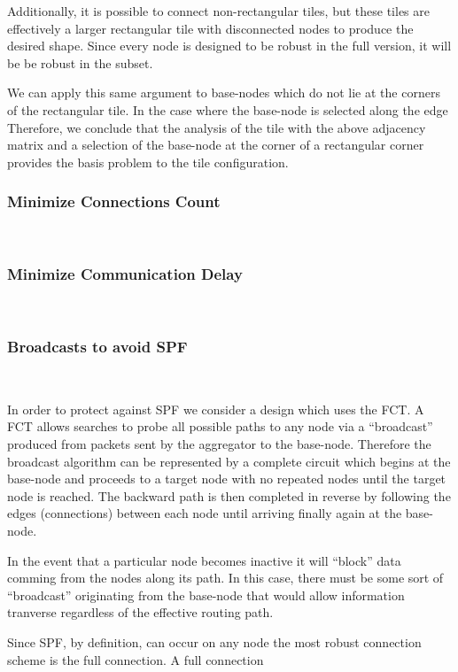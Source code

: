 Additionally, it is possible to connect non-rectangular tiles, but these tiles are effectively a larger rectangular tile with disconnected nodes to produce the desired shape.
Since every node is designed to be robust in the full version, it will be be robust in the subset.

We can apply this same argument to base-nodes which do not lie at the corners of the rectangular tile.
In the case where the base-node is selected along the edge
Therefore, we conclude that the analysis of the tile with the above adjacency matrix and a selection of the base-node at the corner of a rectangular corner provides the basis problem to the tile configuration.

\subsubsection{Minimize Connections Count}~\label{sec:min_conn}

\subsubsection{Minimize Communication Delay}~\label{sec:min_comm}

\subsubsection{Broadcasts to avoid SPF}~\label{sec:broadcast}

In order to protect against SPF we consider a design which uses the FCT.
A FCT allows searches to probe all possible paths to any node via a ``broadcast'' produced from packets sent by the aggregator to the base-node.
Therefore the broadcast algorithm can be represented by a complete circuit which begins at the base-node and proceeds to a target node with no repeated nodes until the target node is reached.
The backward path is then completed in reverse by following the edges (connections) between each node until arriving finally again at the base-node.

In the event that a particular node becomes inactive it will ``block'' data comming from the nodes along its path.
In this case, there must be some sort of ``broadcast'' originating from the base-node that would allow information tranverse regardless of the effective routing path.

Since SPF, by definition, can occur on any node the most robust connection scheme is the full connection.
A full connection

